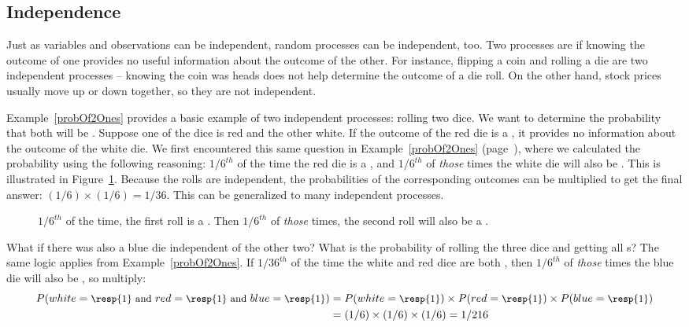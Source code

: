 \subsection{Independence}
\label{probabilityIndependence}

Just as variables and observations can be independent, random processes can be independent, too. Two processes are  if knowing the outcome of one provides no useful information about the outcome of the other. For instance, flipping a coin and rolling a die are two independent processes -- knowing the coin was heads does not help determine the outcome of a die roll. On the other hand, stock prices usually move up or down together, so they are not independent.

Example~\ref{probOf2Ones} provides a basic example of two independent processes: rolling two dice. We want to determine the probability that both will be . Suppose one of the dice is red and the other white. If the outcome of the red die is a , it provides no information about the outcome of the white die. We first encountered this same question in Example~\ref{probOf2Ones} (page~\pageref{probOf2Ones}), where we calculated the probability using the following reasoning: $1/6^{th}$ of the time the red die is a , and $1/6^{th}$ of \emph{those} times the white die will also be . This is illustrated in Figure~\ref{indepForRollingTwo1s}. Because the rolls are independent, the probabilities of the corresponding outcomes can be multiplied to get the final answer: $(1/6)\times(1/6)=1/36$. This can be generalized to many independent processes.

\begin{figure}[hht]
\centering
{}
\caption{$1/6^{th}$ of the time, the first roll is a . Then $1/6^{th}$ of \emph{those} times, the second roll will also be a .}
\label{indepForRollingTwo1s}
\end{figure}

\begin{examplewrap}
\begin{nexample}{What if there was also a blue die independent of the other two? What is the probability of rolling the three dice and getting all s?}\label{threeDice}
The same logic applies from Example~\ref{probOf2Ones}. If $1/36^{th}$ of the time the white and red dice are both , then $1/6^{th}$ of \emph{those} times the blue die will also be , so multiply:
{\begin{align*}
P(white=\text{\small\resp{1} and } red=\text{\small\resp{1} and } blue=\text{\small\resp{1}})
	&= P(white=\text{\small\resp{1}})\times P(red=\text{\small\resp{1}})\times P(blue=\text{\small\resp{1}}) \\
	&= (1/6)\times (1/6)\times (1/6)
	= 1/216
\end{align*}} \vspace{-7mm}
\end{nexample}
\end{examplewrap}

